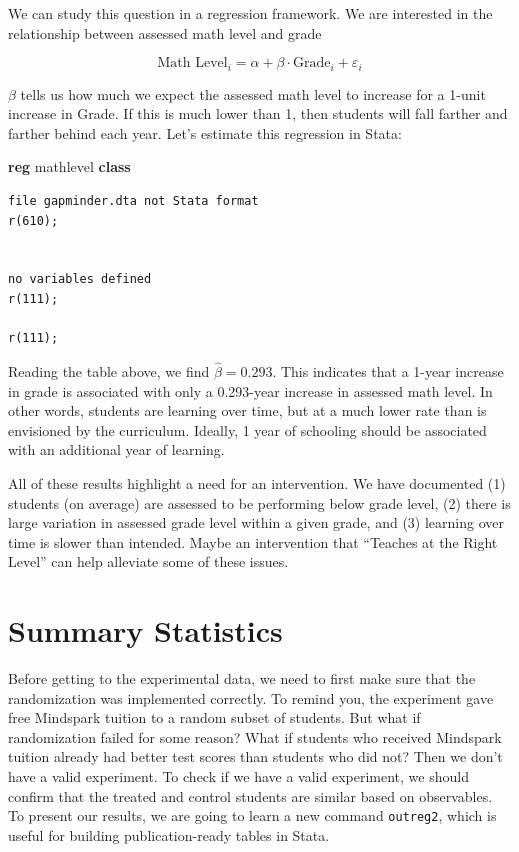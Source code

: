 \documentclass[
]{book}
\newenvironment{Shaded}{\begin{snugshade}}{\end{snugshade}}
\newcommand{\KeywordTok}[1]{\textcolor[rgb]{0.13,0.29,0.53}{\textbf{#1}}}
\newcommand{\NormalTok}[1]{#1}
\begin{document}
We can study this question in a regression framework. We are interested in the relationship between assessed math level and grade

\[ 
\text{Math Level}_i = \alpha + \beta \cdot \text{Grade}_i + \varepsilon_i
\]

\(\beta\) tells us how much we expect the assessed math level to increase for a 1-unit increase in Grade. If this is much lower than 1, then students will fall farther and farther behind each year. Let's estimate this regression in Stata:

\begin{Shaded}
\begin{Highlighting}[]
\KeywordTok{reg}\NormalTok{ mathlevel }\KeywordTok{class} 
\end{Highlighting}
\end{Shaded}

\begin{verbatim}
file gapminder.dta not Stata format
r(610);


no variables defined
r(111);

r(111);
\end{verbatim}

Reading the table above, we find \(\hat{\beta}=0.293\). This indicates that a 1-year increase in grade is associated with only a 0.293-year increase in assessed math level. In other words, students are learning over time, but at a much lower rate than is envisioned by the curriculum. Ideally, 1 year of schooling should be associated with an additional year of learning.

All of these results highlight a need for an intervention. We have documented (1) students (on average) are assessed to be performing below grade level, (2) there is large variation in assessed grade level within a given grade, and (3) learning over time is slower than intended. Maybe an intervention that ``Teaches at the Right Level'' can help alleviate some of these issues.

\section{Summary Statistics}\label{summary-statistics-1}

Before getting to the experimental data, we need to first make sure that the randomization was implemented correctly. To remind you, the experiment gave free Mindspark tuition to a random subset of students. But what if randomization failed for some reason? What if students who received Mindspark tuition already had better test scores than students who did not? Then we don't have a valid experiment. To check if we have a valid experiment, we should confirm that the treated and control students are similar based on observables. To present our results, we are going to learn a new command \texttt{outreg2}, which is useful for building publication-ready tables in Stata.
\end{document}
